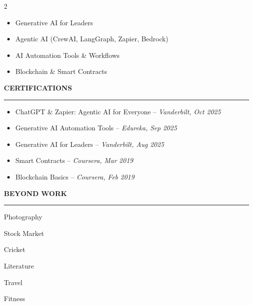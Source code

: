 \documentclass[10pt,a4paper]{article}
\newcommand{\cvsection}[1]{%
  \vspace{8pt}%
  {\normalsize\bfseries\color{textdark}\MakeUppercase{#1}}\par
  \vspace{1pt}%
  {\color{accent}\rule{\linewidth}{1pt}}\par
  \vspace{3pt}%
}
\newcommand{\beyondicon}[2]{%
  \begin{minipage}[t]{0.155\linewidth}
    \centering
    {\Huge\color{accent}#1}\par\vspace{4pt}
    {\small\color{textdark}#2}
  \end{minipage}%
}
\begin{document}
\begin{paracol}{2}
\begin{itemize}
  \item Generative AI for Leaders
  \item Agentic AI (CrewAI, LangGraph, Zapier, Bedrock)
  \item AI Automation Tools \& Workflows
  \item Blockchain \& Smart Contracts
\end{itemize}
\cvsection{Certifications}
\small
\begin{itemize}
  \item ChatGPT \& Zapier: Agentic AI for Everyone -- \textit{Vanderbilt, Oct 2025}
  \item Generative AI Automation Tools -- \textit{Edureka, Sep 2025}
  \item Generative AI for Leaders -- \textit{Vanderbilt, Aug 2025}
  \item Smart Contracts -- \textit{Coursera, Mar 2019}
  \item Blockchain Basics -- \textit{Coursera, Feb 2019}
\end{itemize}
\end{paracol}

\vspace{6pt}
\cvsection{Beyond Work}

\noindent
\beyondicon{\faCamera}{Photography}\hfill
\beyondicon{\faChartLine}{Stock Market}\hfill
\beyondicon{\faBaseballBall}{Cricket}\hfill
\beyondicon{\faBookOpen}{Literature}\hfill
\beyondicon{\faPlane}{Travel}\hfill
\beyondicon{\faDumbbell}{Fitness}
\end{document}
